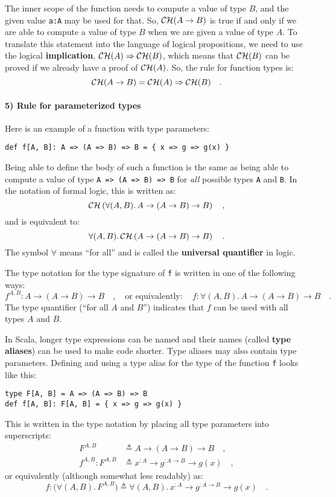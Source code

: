 \noindent The inner scope of the function needs to compute a value
of type $B$, and the given value \lstinline!a:A! may be used for
that. So, ${\cal CH}(A\rightarrow B)$ is true if and only if we are
able to compute a value of type $B$ when we are given a value of
type $A$. To translate this statement into the language of logical
propositions, we need to use the logical
\textbf{implication}, ${\cal CH}(A)\Rightarrow{\cal CH}(B)$, which
means that ${\cal CH}(B)$ can be proved if we already have a proof
of ${\cal CH}(A)$. So, the rule for function types is:
\[
{\cal CH}(A\rightarrow B)={\cal CH}(A)\Rightarrow{\cal CH}(B)\quad.
\]


\paragraph{5) Rule for parameterized types}

Here is an example of a function with type parameters:
\begin{lstlisting}
def f[A, B]: A => (A => B) => B = { x => g => g(x) }
\end{lstlisting}
Being able to define the body of such a function is the same as being
able to compute a value of type \lstinline!A => (A => B) => B! for
\emph{all} possible types \lstinline!A! and \lstinline!B!. In the
notation of formal logic, this is written as:
\[
{\cal CH}\left(\forall(A,B).\,A\rightarrow(A\rightarrow B)\rightarrow B\right)\quad,
\]
and is equivalent to:
\[
\forall(A,B).\,{\cal CH}\left(A\rightarrow(A\rightarrow B)\rightarrow B\right)\quad.
\]
The symbol $\forall$ means \textsf{``}for all\textsf{''} and is called the \textbf{universal
quantifier} in logic. 

The type notation for the type signature of \lstinline!f! is written
in one of the following ways:
\[
f^{A,B}:A\rightarrow\left(A\rightarrow B\right)\rightarrow B\quad,\quad\text{or equivalently}:\quad f:\forall(A,B).\,A\rightarrow\left(A\rightarrow B\right)\rightarrow B\quad.
\]
The type quantifier (\textsf{``}for all $A$ and $B$\textsf{''}) indicates that $f$
can be used with all types $A$ and $B$.

In Scala, longer type expressions can be named and their names (called
\textbf{type aliases}) can be used to make code
shorter. Type aliases may also contain type parameters. Defining and
using a type alias for the type of the function \lstinline!f! looks
like this:
\begin{lstlisting}
type F[A, B] = A => (A => B) => B
def f[A, B]: F[A, B] = { x => g => g(x) }
\end{lstlisting}
This is written in the type notation by placing all type parameters
into superscripts:
\begin{align*}
F^{A,B} & \triangleq A\rightarrow\left(A\rightarrow B\right)\rightarrow B\quad,\\
f^{A,B}:F^{A,B} & \triangleq x^{:A}\rightarrow g^{:A\rightarrow B}\rightarrow g(x)\quad,
\end{align*}
or equivalently (although somewhat less readably) as:
\[
f:\big(\forall(A,B).\,F^{A,B}\big)\triangleq\forall(A,B).\,x^{:A}\rightarrow g^{:A\rightarrow B}\rightarrow g(x)\quad.
\]


